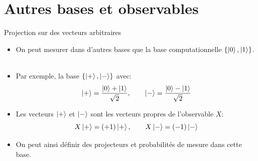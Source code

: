 \documentclass[aspectratio=169,12pt]{beamer}
\begin{document}
\section{Autres bases et observables}

\begin{frame}{Projection sur des vecteurs arbitraires}
  \begin{itemize}[<+->]
    \setlength{\itemsep}{0.8em}
    \item On peut mesurer dans d'autres bases que la base computationnelle $\{\ket{0}, \ket{1}\}$.\\~\\
    \item Par exemple, la base $\{\ket{+}, \ket{-}\}$ avec:
    $$\ket{+} = \frac{\ket{0}+\ket{1}}{\sqrt{2}}, \qquad \ket{-} = \frac{\ket{0}-\ket{1}}{\sqrt{2}}$$
    \item Les vecteurs $\ket{+}$ et $\ket{-}$ sont les vecteurs propres de l'observable $X$:
    $$X\ket{+} = (+1)\ket{+}, \qquad X\ket{-} = (-1)\ket{-}$$
    \item On peut ainsi définir des projecteurs et probabilités de mesure dans cette base.
  \end{itemize}
\end{frame}


\end{document}
